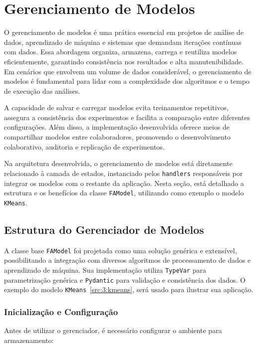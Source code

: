 \section{Gerenciamento de Modelos}
\label{sec:3:modelos}

O gerenciamento de modelos é uma prática essencial em projetos de análise de dados, aprendizado de máquina e sistemas que demandam iterações contínuas com dados. Essa abordagem organiza, armazena, carrega e reutiliza modelos eficientemente, garantindo consistência nos resultados e alta manutenibilidade. Em cenários que envolvem um volume de dados considerável, o gerenciamento de modelos é fundamental para lidar com a complexidade dos algoritmos e o tempo de execução das análises.

A capacidade de salvar e carregar modelos evita treinamentos repetitivos, assegura a consistência dos experimentos e facilita a comparação entre diferentes configurações. Além disso, a implementação desenvolvida oferece meios de compartilhar modelos entre colaboradores, promovendo o desenvolvimento colaborativo, auditoria e replicação de experimentos.

Na arquitetura desenvolvida, o gerenciamento de modelos está diretamente relacionado à camada de estados, instanciado pelos \texttt{handlers} responsáveis por integrar os modelos com o restante da aplicação. Nesta seção, está detalhado a estrutura e os benefícios da classe \texttt{FAModel}, utilizando como exemplo o modelo \texttt{KMeans}.

\subsection{Estrutura do Gerenciador de Modelos}

A classe base \texttt{FAModel} foi projetada como uma solução genérica e extensível, possibilitando a integração com diversos algoritmos de processamento de dados e aprendizado de máquina. Sua implementação utiliza \texttt{TypeVar} para parametrização genérica e \texttt{Pydantic} para validação e consistência dos dados. O exemplo do modelo \texttt{KMeans}~\ref{src:3:kmeans}, será usado para ilustrar sua aplicação.

\subsubsection*{Inicialização e Configuração}

Antes de utilizar o gerenciador, é necessário configurar o ambiente para armazenamento:

